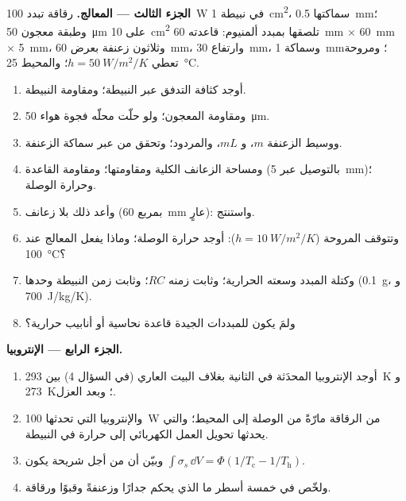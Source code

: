 \begin{problem}
\textbf{الجزء الثالث --- المعالج.}
رقاقة تبدد \qty{100}{W} في نبيطة \qty{1}{cm^2}، سماكتها \qty{0.5}{mm}؛
وطبقة معجون \qty{50}{\micro m} على \qty{10}{cm^2} تلصقها
بمبدد ألمنيوم: قاعدته \qty{60}{mm} $\times$ \qty{60}{mm} $\times$
\qty{5}{mm}، وثلاثون زعنفة بعرض \qty{60}{mm}، وارتفاع \qty{30}{mm}، وسماكة \qty{1}{mm}؛
ومروحة تعطي $h = \qty{50}{W/m^2/K}$؛ والمحيط \qty{25}{\celsius}.
\begin{enumerate}[resume]
  \item أوجد كثافة التدفق عبر النبيطة؛ ومقاومة النبيطة.
  \item ومقاومة المعجون؛ ولو حلّت محلّه فجوة هواء \qty{50}{\micro m}.
  \item ووسيط الزعنفة $m$، و $mL$، والمردود؛ وتحقق من 
        عبر سماكة الزعنفة.
  \item ومساحة الزعانف الكلية ومقاومتها؛ ومقاومة
        القاعدة (بالتوصيل عبر \qty{5}{mm})؛ وحرارة الوصلة.
  \item وأعد ذلك بلا زعانف (بمربع \qty{60}{mm} عارٍ): واستنتج.
  \item وتتوقف المروحة ($h = \qty{10}{W/m^2/K}$): أوجد حرارة الوصلة؛
        وماذا يفعل المعالج عند \qty{100}{\celsius}؟
  \item وكتلة المبدد وسعته الحرارية؛ وثابت زمنه $RC$؛
        وثابت زمن النبيطة وحدها (\qty{0.1}{g}، و \qty{700}{J/kg/K}).
  \item ولمَ يكون للمبددات الجيدة قاعدة نحاسية أو أنابيب حرارية؟
\end{enumerate}

\textbf{الجزء الرابع --- الإنتروبيا.}
\begin{enumerate}[resume]
  \item أوجد الإنتروبيا المحدَثة في الثانية بغلاف البيت العاري
        (في السؤال 4) بين \qty{293}{K} و \qty{273}{K}؛ وبعد
        العزل.
  \item والإنتروبيا التي تحدثها \qty{100}{W} من الرقاقة مارّةً من
        الوصلة إلى المحيط؛ والتي يحدثها تحويل العمل الكهربائي
        إلى حرارة في النبيطة.
  \item وبيّن أن من أجل شريحة يكون $\int\sigma_s\,\dd V = \Phi(1/T_{\text{c}} -
        1/T_{\text{h}})$.
  \item ولخّص في خمسة أسطر ما الذي يحكم جدارًا وزعنفةً وقبوًا
        ورقاقة.
\end{enumerate}
\end{problem}
